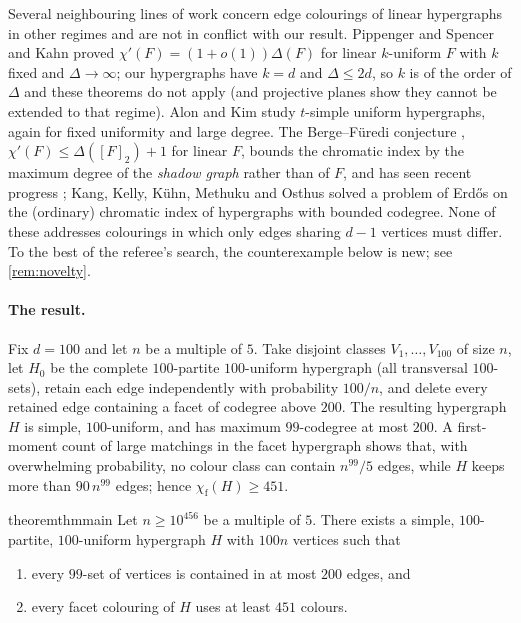 \documentclass[11pt,a4paper]{article}
\theoremstyle{plain}
\theoremstyle{definition}
\theoremstyle{remark}
\newcommand{\chif}{\chi_{\mathrm{f}}}
\begin{document}
Several neighbouring lines of work concern edge colourings of linear hypergraphs in other regimes and are not in conflict with our result. Pippenger and Spencer \cite{PS89} and Kahn \cite{Kahn96} proved $\chi'(F)=(1+o(1))\Delta(F)$ for linear $k$-uniform $F$ with $k$ fixed and $\Delta\to\infty$; our hypergraphs have $k=d$ and $\Delta\le2d$, so $k$ is of the order of $\Delta$ and these theorems do not apply (and projective planes show they cannot be extended to that regime). Alon and Kim \cite{AK97} study $t$-simple uniform hypergraphs, again for fixed uniformity and large degree. The Berge--F\"uredi conjecture \cite{Furedi86,Berge89}, $\chi'(F)\le\Delta([F]_2)+1$ for linear $F$, bounds the chromatic index by the maximum degree of the \emph{shadow graph} rather than of $F$, and has seen recent progress \cite{BFH24a,BFH24b,MA25}; Kang, Kelly, K\"uhn, Methuku and Osthus \cite{KKKMO21} solved a problem of Erd\H{o}s on the (ordinary) chromatic index of hypergraphs with bounded codegree. None of these addresses colourings in which only edges sharing $d-1$ vertices must differ. To the best of the referee's search, the counterexample below is new; see \cref{rem:novelty}.

\paragraph{The result.} Fix $d=100$ and let $n$ be a multiple of $5$. Take disjoint classes $V_1,\dots,V_{100}$ of size $n$, let $H_0$ be the complete $100$-partite $100$-uniform hypergraph (all transversal $100$-sets), retain each edge independently with probability $100/n$, and delete every retained edge containing a facet of codegree above $200$. The resulting hypergraph $H$ is simple, $100$-uniform, and has maximum $99$-codegree at most $200$. A first-moment count of large matchings in the facet hypergraph shows that, with overwhelming probability, no colour class can contain $n^{99}/5$ edges, while $H$ keeps more than $90\,n^{99}$ edges; hence $\chif(H)\ge451$.

\begin{restatable}{theorem}{thmmain}\label{thm:main}
Let $n\ge10^{456}$ be a multiple of $5$. There exists a simple, $100$-partite, $100$-uniform hypergraph $H$ with $100n$ vertices such that
\begin{enumerate}[nosep]
\item every $99$-set of vertices is contained in at most $200$ edges, and
\item every facet colouring of $H$ uses at least $451$ colours.
\end{enumerate}
\end{restatable}
\end{document}
